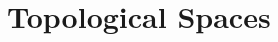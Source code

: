 \tableofcontents



\chapter{Topological Spaces}























































%
